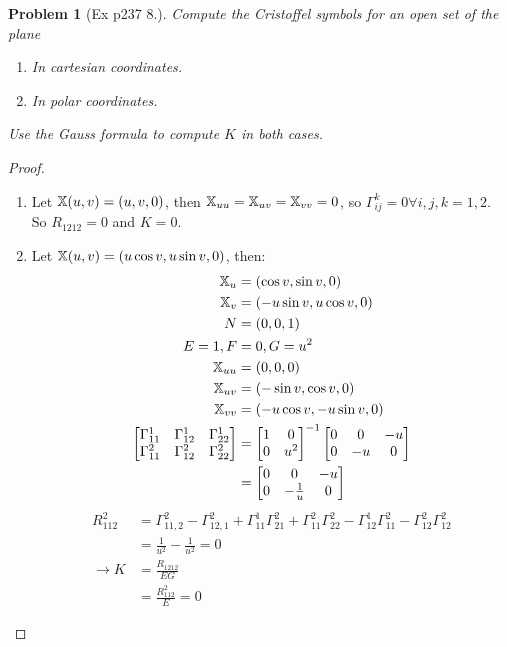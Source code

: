 \documentclass[10pt,a4paper]{article}
\newcounter{theProblemCounter}
\newtheorem{problem}[theProblemCounter]{Problem}
\begin{document}
\setcounter{theProblemCounter}{3}
\begin{problem}[Ex p237 8.]
Compute the Cristoffel symbols for an open set of the plane
\begin{enumerate}
\item[(a)] In cartesian coordinates.
\item[(b)] In polar coordinates.
\end{enumerate}
Use the Gauss formula to compute $K$ in both cases.
\end{problem}
\begin{proof}
\begin{enumerate}
\item[(a)]
Let $\mathbb{X}(u,v)=(u,v,0)$, then $\mathbb{X}_{uu}=\mathbb{X}_{uv}=\mathbb{X}_{vv}=0$, so $\Gamma_{ij}^k=0 \forall i,j,k=1,2$.\\
So $R_{1212}=0$ and $K=0$.
\item[(b)]
Let $\mathbb{X}(u,v)=(u\cos v,u\sin v,0)$, then:
\begin{align*}
\mathbb{X}_u&=(\cos v,\sin v,0)\\
\mathbb{X}_v&=(-u\sin v,u\cos v,0)\\
N&=(0,0,1)\\
E=1, F&=0, G=u^2\\
\mathbb{X}_{uu}&=(0,0,0)\\
\mathbb{X}_{uv}&=(-\sin v,\cos v,0)\\
\mathbb{X}_{vv}&=(-u\cos v,-u\sin v,0)\\
\begin{bmatrix}
\Gamma_{11}^1 & \Gamma_{12}^1 & \Gamma_{22}^1\\
\Gamma_{11}^2 & \Gamma_{12}^2 & \Gamma_{22}^2\\
\end{bmatrix}&=
\begin{bmatrix}
1 & 0\\0 & u^2
\end{bmatrix}^{-1}
\begin{bmatrix}
0 & 0 & -u\\
0 & -u & 0\\
\end{bmatrix}\\
&=\begin{bmatrix}
0 & 0 & -u\\
0 & -\frac{1}{u} & 0\\
\end{bmatrix}
\end{align*}
\begin{align*}
R_{112}^2&=\Gamma_{11,2}^2-\Gamma_{12,1}^2+\Gamma_{11}^1\Gamma_{21}^2+\Gamma_{11}^2\Gamma_{22}^2-\Gamma_{12}^1\Gamma_{11}^2-\Gamma_{12}^2\Gamma_{12}^2\\
&=\frac{1}{u^2}-\frac{1}{u^2}=0\\
\rightarrow K&=\frac{R_{1212}}{EG}\\
&=\frac{R_{112}^2}{E}=0
\end{align*}
\end{enumerate}
\end{proof}
\end{document}
